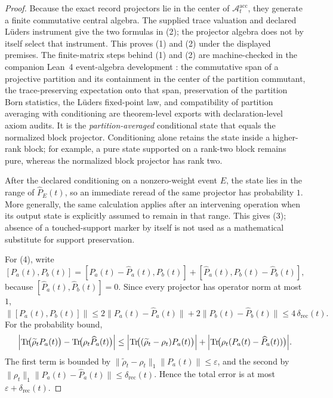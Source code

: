 \documentclass[11pt]{article}
\theoremstyle{remark}
\theoremstyle{plain}
\begin{document}
\begin{proof}
Because the exact record projectors lie in the center of \(\mathcal A_t^{\mathrm{acc}}\), they
generate a finite commutative central algebra. The supplied trace valuation and
declared L\"uders instrument give the two formulas in (2); the projector algebra
does not by itself select that instrument. This proves (1) and (2) under the
displayed premises.
The finite-matrix steps behind (1) and (2) are machine-checked in the companion Lean~4
event-algebra development \cite{eventalgebraLean}: the commutative span of a projective
partition and its containment in the center of the partition commutant, the trace-preserving
expectation onto that span, preservation of the partition Born statistics, the L\"uders
fixed-point law, and compatibility of partition averaging with conditioning
are theorem-level exports with declaration-level axiom audits. It is the
\emph{partition-averaged} conditional state that equals the normalized block
projector. Conditioning alone retains the state inside a higher-rank block;
for example, a pure state supported on a rank-two block remains pure, whereas
the normalized block projector has rank two.

After the declared conditioning on a nonzero-weight event \(E\), the state lies
in the range of \(\widehat P_E(t)\), so an immediate reread of the same
projector has probability \(1\). More generally, the same calculation applies
after an intervening operation when its output state is explicitly assumed to
remain in that range. This gives (3); absence of a touched-support marker by
itself is not used as a mathematical substitute for support preservation.

For (4), write
\[
[P_a(t),P_b(t)]
=
[P_a(t)-\widehat P_a(t),P_b(t)]
+
[\widehat P_a(t),P_b(t)-\widehat P_b(t)],
\]
because \([\widehat P_a(t),\widehat P_b(t)]=0\). Since every projector has operator norm at most
\(1\),
\[
\|[P_a(t),P_b(t)]\|
\le
2\|P_a(t)-\widehat P_a(t)\|
+
2\|P_b(t)-\widehat P_b(t)\|
\le
4\,\delta_{\mathrm{rec}}(t).
\]
For the probability bound,
\[
\Bigl|
\operatorname{Tr}\!\bigl(\widetilde\rho_t P_a(t)\bigr)
-
\operatorname{Tr}\!\bigl(\rho_t \widehat P_a(t)\bigr)
\Bigr|
\le
\Bigl|\operatorname{Tr}\!\bigl((\widetilde\rho_t-\rho_t)P_a(t)\bigr)\Bigr|
+
\Bigl|\operatorname{Tr}\!\bigl(\rho_t(P_a(t)-\widehat P_a(t))\bigr)\Bigr|.
\]
The first term is bounded by \(\|\widetilde\rho_t-\rho_t\|_1\|P_a(t)\|\le \varepsilon\), and the
second by \(\|\rho_t\|_1\|P_a(t)-\widehat P_a(t)\|\le \delta_{\mathrm{rec}}(t)\). Hence the total
error is at most \(\varepsilon+\delta_{\mathrm{rec}}(t)\).
\end{proof}
\end{document}
